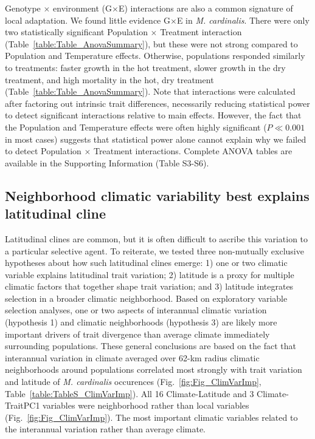 \documentclass[11pt, oneside]{article}
\begin{document}
Genotype $\times$ environment (G$\times$E) interactions are also a common signature of local adaptation. We found little evidence G$\times$E in \textit{M. cardinalis}. There were only two statistically significant Population $\times$ Treatment interaction (Table~\ref{table:Table_AnovaSummary}), but these were not strong compared to Population and Temperature effects. Otherwise, populations responded similarly to treatments: faster growth in the hot treatment, slower growth in the dry treatment, and high mortality in the hot, dry treatment (Table~\ref{table:Table_AnovaSummary}). Note that interactions were calculated after factoring out intrinsic trait differences, necessarily reducing statistical power to detect significant interactions relative to main effects. However, the fact that the Population and Temperature effects were often highly significant ($P \ll 0.001$ in most cases) suggests that statistical power alone cannot explain why we failed to detect Population $\times$ Treatment interactions. Complete ANOVA tables are available in the Supporting Information (Table S3-S6).

\subsection*{Neighborhood climatic variability best explains latitudinal cline}

Latitudinal clines are common, but it is often difficult to ascribe this variation to a particular selective agent. To reiterate, we tested three non-mutually exclusive hypotheses about how such latitudinal clines emerge: 1) one or two climatic variable explains latitudinal trait variation; 2) latitude is a proxy for multiple climatic factors that together shape trait variation; and 3) latitude integrates selection in a broader climatic neighborhood. Based on exploratory variable selection analyses, one or two aspects of interannual climatic variation (hypothesis 1) and climatic neighborhoods (hypothesis 3) are likely more important drivers of trait divergence than average climate immediately surrounding populations. These general conclusions are based on the fact that interannual variation in climate averaged over 62-km radius climatic neighborhoods around populations correlated most strongly with trait variation and latitude of \textit{M. cardinalis} occurences (Fig.~\ref{fig:Fig_ClimVarImp}, Table~\ref{table:TableS_ClimVarImp}). All 16 Climate-Latitude and 3 Climate-TraitPC1 variables were neighborhood rather than local variables (Fig.~\ref{fig:Fig_ClimVarImp}). The most important climatic variables related to the interannual variation rather than average climate.
\end{document}
